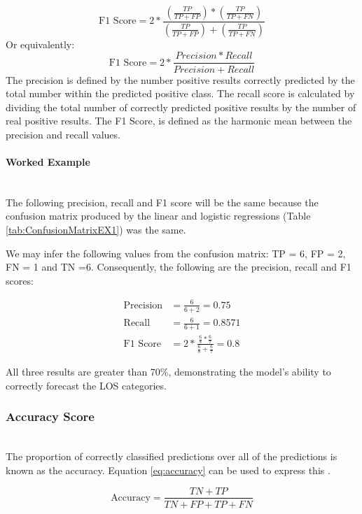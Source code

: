 \documentclass[../thesis.tex]{subfiles}
\begin{document}
\begin{equation}
 \text{F1 Score} = 2 * \frac{(\frac{TP}{TP + FP}) *(\frac{TP}{TP + FN})}{(\frac{TP}{TP + FP}) + (\frac{TP}{TP + FN})}
\end{equation}
Or equivalently:
\begin{equation}\label{eq:f1score}
    \text{F1 Score} = 2 * \frac{Precision * Recall}{Precision + Recall}
\end{equation}
The precision is defined by the number positive results correctly predicted by the total number within the predicted positive class. The recall score is calculated by dividing the total number of correctly predicted positive results by the number of real positive results. The F1 Score, is defined as the harmonic mean between the precision and recall values.

\paragraph{Worked Example}\\
The following precision, recall and F1 score will be the same because the confusion matrix produced by the linear and logistic regressions (Table \ref{tab:ConfusionMatrixEX1}) was the same.

We may infer the following values from the confusion matrix: TP = 6, FP = 2, FN = 1 and TN =6. Consequently, the following are the precision, recall and F1 scores:

\begin{align}
    \text{Precision} &= \frac{6}{6+2}= 0.75\\
    \text{Recall} &= \frac{6}{6+1}= 0.8571\\
    \text{F1 Score} &= 2 * \frac{\frac{6}{8} * \frac{6}{7}}{\frac{6}{8} + \frac{6}{7}}= 0.8
\end{align}

All three results are greater than 70\%, demonstrating the model's ability to correctly forecast the LOS categories.

\subsubsection{Accuracy Score}\\
The proportion of correctly classified predictions over all of the predictions is known as the accuracy. Equation \eqref{eq:accuracy} can be used to express this \cite{Baratloo2015}.

\begin{equation}\label{eq:accuracy}
    \text{Accuracy} = \frac{TN + TP}{TN + FP + TP + FN}
\end{equation}
\end{document}
